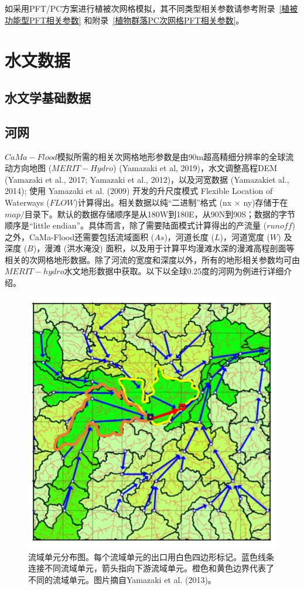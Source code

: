 如采用PFT/PC方案进行植被次网格模拟，其不同类型相关参数请参考附录~\ref{植被功能型PFT相关参数} 和附录~\ref{植物群落PC次网格PFT相关参数}。


\section{水文数据}\label{水文数据}
\subsection{水文学基础数据}
\subsection{河网}
$CaMa-Flood$模拟所需的相关次网格地形参数是由90m超高精细分辨率的全球流动方向地图 ($MERIT-Hydro$) (Yamazaki et al, 2019)，水文调整高程DEM (Yamazaki et al., 2017; Yamazaki et al., 2012)，以及河宽数据 (Yamazakiet al., 2014); 使用 Yamazaki et al. (2009) 开发的升尺度模式 Flexible Location of Waterways ($FLOW$)计算得出。相关数据以纯“二进制”格式 (nx $\times$ ny)存储于在$map/$目录下。默认的数据存储顺序是从180W到180E，从90N到90S；数据的字节顺序是“little endian”。具体而言，除了需要陆面模式计算得出的产流量 ($runoff$) 之外，CaMa-Flood还需要包括流域面积 ($As$)，河道长度 ($L$)，河道宽度 ($W$) 及深度 ($B$)，漫滩 (洪水淹没) 面积，以及用于计算平均漫滩水深的漫滩高程剖面等相关的次网格地形数据。除了河流的宽度和深度以外，所有的地形相关参数均可由$MERIT-hydro$水文地形数据中获取。以下以全球0.25度的河网为例进行详细介绍。
{
\begin{figure}[]
\centering
\includegraphics{Figures/基础数据/CaMa-Flood流域单元分布图.png}
\caption{流域单元分布图。每个流域单元的出口用白色四边形标记。蓝色线条连接不同流域单元，箭头指向下游流域单元。橙色和黄色边界代表了不同的流域单元。图片摘自Yamazaki et al. (2013)。}
\label{fig:CaMa-Flood流域单元分布图}
\end{figure}
}

